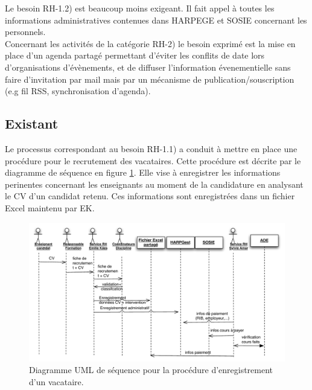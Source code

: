\documentclass{book}
\begin{document}
Le besoin RH-1.2) est beaucoup moins exigeant. Il fait appel à toutes
les informations administratives contenues dans HARPEGE et SOSIE
concernant les personnels.\\


Concernant les activités de la catégorie RH-2) le besoin exprimé 
est la mise en place d'un agenda partagé permettant d'éviter
les conflits de date lors d'organisations d'évènements, et de 
diffuser l'information évenementielle sans faire d'invitation
par mail mais par un mécanisme de publication/souscription
(e.g fil RSS, synchronisation d'agenda).  



\subsection{Existant}

Le processus correspondant au besoin RH-1.1) a conduit à mettre en
place une procédure pour le recrutement des vacataires. Cette procédure
est décrite par le diagramme de séquence en figure \ref{fg:rh_seq_vacataires}.
Elle vise à enregistrer les informations perinentes concernant les enseignants
au moment de la candidature en analysant le CV d'un candidat retenu. Ces
informations sont enregistrées dans un fichier Excel maintenu par EK.

\begin{figure}[hbt]
\begin{center}
\includegraphics[width=\linewidth]{figs/rh_seq_vacataires.pdf}
\end{center}
\caption{Diagramme UML de séquence pour la procédure d'enregistrement d'un vacataire.}
\label{fg:rh_seq_vacataires}
\end{figure}
\end{document}
